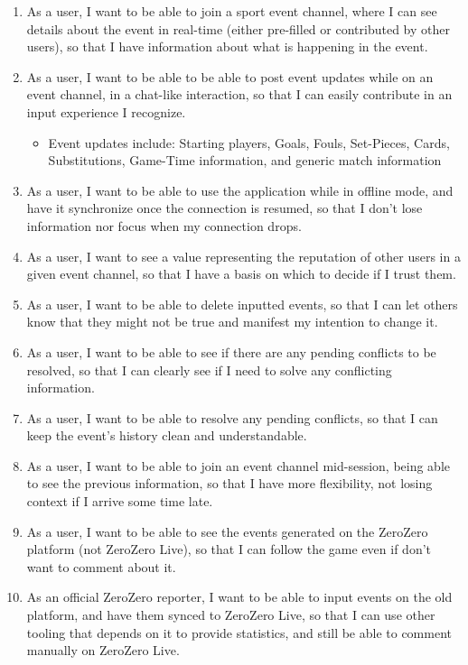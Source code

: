 \begin{enumerate}[leftmargin  = 3.25\parindent, align=left, label=US\arabic*, start=1]
    \item As a user, I want to be able to join a sport event channel, where I can see details about the event in real-time (either pre-filled or contributed by other users), so that I have information about what is happening in the event.
    \item As a user, I want to be able to be able to post event updates while on an event channel, in a chat-like interaction, so that I can easily contribute in an input experience I recognize.
    \begin{itemize}
        \item Event updates include: Starting players, Goals, Fouls, Set-Pieces, Cards, Substitutions, Game-Time information, and generic match information
    \end{itemize} 
    \item As a user, I want to be able to use the application while in offline mode, and have it synchronize once the connection is resumed, so that I don't lose information nor focus when my connection drops.
    \item As a user, I want to see a value representing the reputation of other users in a given event channel, so that I have a basis on which to decide if I trust them. 
    \item As a user, I want to be able to delete inputted events, so that I can let others know that they might not be true and manifest my intention to change it.
    \item As a user, I want to be able to see if there are any pending conflicts to be resolved, so that I can clearly see if I need to solve any conflicting information.
    \item As a user, I want to be able to resolve any pending conflicts, so that I can keep the event's history clean and understandable.
    \item As a user, I want to be able to join an event channel mid-session, being able to see the previous information, so that I have more flexibility, not losing context if I arrive some time late.
    \item\label{user-story:sync-to-api} As a user, I want to be able to see the events generated on the ZeroZero platform (not ZeroZero Live), so that I can follow the game even if don't want to comment about it.
    \item\label{user-story:sync-from-api} As an official ZeroZero reporter, I want to be able to input events on the old platform, and have them synced to ZeroZero Live, so that I can use other tooling that depends on it to provide statistics, and still be able to comment manually on ZeroZero Live.
\end{enumerate}

